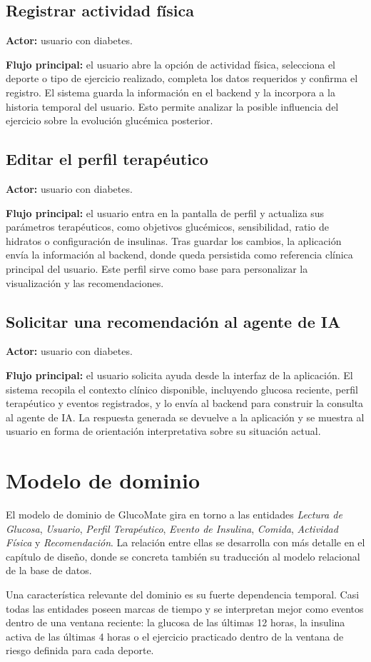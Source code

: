 \subsection{Registrar actividad física}

\textbf{Actor:} usuario con diabetes.

\textbf{Flujo principal:} el usuario abre la opción de actividad física, selecciona el
deporte o tipo de ejercicio realizado, completa los datos requeridos y confirma el
registro. El sistema guarda la información en el backend y la incorpora a la historia
temporal del usuario. Esto permite analizar la posible influencia del ejercicio sobre la
evolución glucémica posterior.

\subsection{Editar el perfil terapéutico}

\textbf{Actor:} usuario con diabetes.

\textbf{Flujo principal:} el usuario entra en la pantalla de perfil y actualiza sus
parámetros terapéuticos, como objetivos glucémicos, sensibilidad, ratio de hidratos o
configuración de insulinas. Tras guardar los cambios, la aplicación envía la información
al backend, donde queda persistida como referencia clínica principal del usuario. Este
perfil sirve como base para personalizar la visualización y las recomendaciones.

\subsection{Solicitar una recomendación al agente de IA}

\textbf{Actor:} usuario con diabetes.

\textbf{Flujo principal:} el usuario solicita ayuda desde la interfaz de la aplicación.
El sistema recopila el contexto clínico disponible, incluyendo glucosa reciente, perfil
terapéutico y eventos registrados, y lo envía al backend para construir la consulta al
agente de IA. La respuesta generada se devuelve a la aplicación y se muestra al usuario en
forma de orientación interpretativa sobre su situación actual.

\section{Modelo de dominio}

El modelo de dominio de GlucoMate gira en torno a las entidades \textit{Lectura de
Glucosa}, \textit{Usuario}, \textit{Perfil Terapéutico}, \textit{Evento de Insulina},
\textit{Comida}, \textit{Actividad Física} y \textit{Recomendación}. La relación entre
ellas se desarrolla con más detalle en el capítulo de diseño, donde se concreta también
su traducción al modelo relacional de la base de datos.

Una característica relevante del dominio es su fuerte dependencia temporal. Casi todas las
entidades poseen marcas de tiempo y se interpretan mejor como eventos dentro de una ventana
reciente: la glucosa de las últimas 12 horas, la insulina activa de las últimas 4 horas o
el ejercicio practicado dentro de la ventana de riesgo definida para cada deporte.